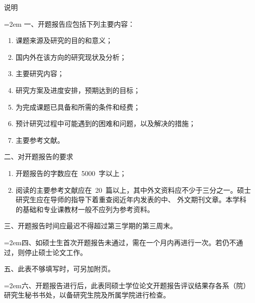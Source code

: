 {%
\newpage
\thispagestyle{empty}
\vspace*{2em}
\begin{center}
  \heiti{}说\hspace{3em}明
\end{center}
\vspace*{40pt}
	\renewcommand{\arraystretch}{1.25}
    {\songti{}
    \hangindent=2em
	\noindent 一、开题报告应包括下列主要内容：
    \begin{enumerate}[leftmargin=36pt]
	\item 课题来源及研究的目的和意义；
	\item 国内外在该方向的研究现状及分析；
	\item 主要研究内容；
	\item 研究方案及进度安排，预期达到的目标；
	\item 为完成课题已具备和所需的条件和经费；
	\item 预计研究过程中可能遇到的困难和问题，以及解决的措施；
	\item 主要参考文献。
    \end{enumerate}
    \noindent 二、对开题报告的要求
	\begin{enumerate}[leftmargin=36pt]
	\item 开题报告的字数应在~5000~字以上；
	\item 阅读的主要参考文献应在~20~篇以上，其中外文资料应不少于三分之一。硕士研究生应在导师的指导下着重查阅近年内发表的中、\hspace{-1pt} 外文期刊文章。\hspace{-1pt}本学科的基础和专业课教材一般不应列为参考资料。
    \end{enumerate}
    \noindent 三、开题报告时间应最迟不得超过第三学期的第三周末。

    \hangindent=2em\noindent 四、如硕士生首次开题报告未通过，\hspace{-2pt}需在一个月内再进行一次。\hspace{-3pt}若仍不通过，\hspace{-2pt}则停止硕士论文工作。

    \noindent 五、此表不够填写时，可另加附页。

\hangindent=2em\noindent 六、开题报告进行后，此表同硕士学位论文开题报告评议结果存各系（院）研究生秘书书处，以备研究生院及所属学院进行检查。

    }
	\renewcommand{\arraystretch}{1}
    \clearpage
}
\fi
\makeatother
